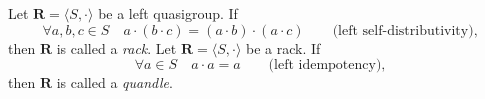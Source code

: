 \documentclass{mcom-l}
\begin{document}
\begin{definition}
Let $\mathbf{R} = \langle S, \cdot \rangle$ be a left quasigroup. 
If 
\[\forall a,b,c \in S \quad a \cdot (b \cdot c) = (a \cdot b) \cdot (a \cdot c) \hspace{2em}\text{(left self-distributivity),}\]
then $\mathbf{R}$ is called a \emph{rack}.\newline\newline
Let $\mathbf{R} = \langle S, \cdot \rangle$ be a rack.
If 
\[\forall a \in S \quad a \cdot a = a \hspace{2em}\text{(left idempotency),}\]
then $\mathbf{R}$ is called a \emph{quandle}.
\end{definition}
\end{document}
